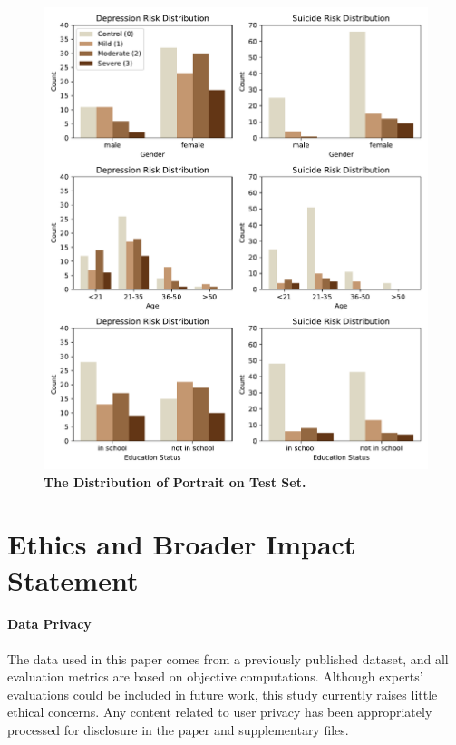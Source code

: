 \begin{figure}[!t]
    \centering
    \includegraphics[width=\linewidth]{fig/distribution_test.pdf}
    \caption{\textbf{The Distribution of Portrait on Test Set.}}
    \label{fig:portrait distribution test}
\end{figure}



\section{Ethics and Broader Impact Statement}

    \paragraph{Data Privacy}
    The data used in this paper comes from a previously published dataset, and all evaluation metrics are based on objective computations. Although experts' evaluations could be included in future work, this study currently raises little ethical concerns. Any content related to user privacy has been appropriately processed for disclosure in the paper and supplementary files.

